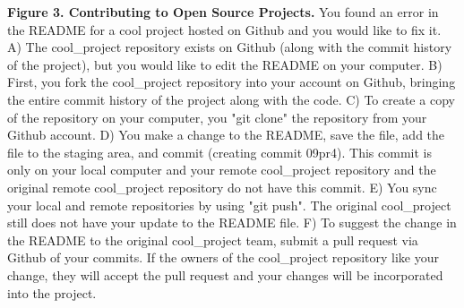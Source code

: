 \textbf{Figure 3. Contributing to Open Source Projects.} You found an error in the README for a cool project hosted on Github and you would like to fix it. A) The cool\_project repository exists on Github (along with the commit history of the project), but you would like to edit the README on your computer. B) First, you fork the cool\_project repository into your account on Github, bringing the entire commit history of the project along with the code. C) To create a copy of the repository on your computer, you "git clone" the repository from your Github account. D) You make a change to the README, save the file, add the file to the staging area, and commit (creating commit 09pr4). This commit is only on your local computer and your remote cool\_project repository and the original remote cool\_project repository do not have this commit. E) You sync your local and remote repositories by using "git push". The original cool\_project still does not have your update to the README file. F) To suggest the change in the README to the original cool\_project team, submit a pull request via Github of your commits. If the owners of the cool\_project repository like your change, they will accept the pull request and your changes will be incorporated into the project. 